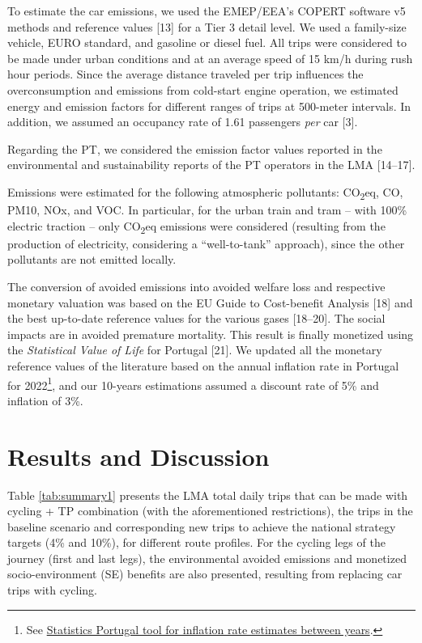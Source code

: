 \documentclass[runningheads]{llncs}
\begin{document}
To estimate the car emissions, we used the EMEP/EEA's COPERT software v5
methods and reference values {[}13{]} for a Tier 3 detail level. We used
a family-size vehicle, EURO standard, and gasoline or diesel fuel. All
trips were considered to be made under urban conditions and at an
average speed of 15 km/h during rush hour periods. Since the average
distance traveled per trip influences the overconsumption and emissions
from cold-start engine operation, we estimated energy and emission
factors for different ranges of trips at 500-meter intervals. In
addition, we assumed an occupancy rate of 1.61 passengers \emph{per} car
{[}3{]}.

Regarding the PT, we considered the emission factor values reported in
the environmental and sustainability reports of the PT operators in the
LMA {[}14--17{]}.

Emissions were estimated for the following atmospheric pollutants:
CO\textsubscript{2}eq, CO, PM10, NOx, and VOC. In particular, for the
urban train and tram -- with 100\% electric traction -- only
CO\textsubscript{2}eq emissions were considered (resulting from the
production of electricity, considering a ``well-to-tank'' approach),
since the other pollutants are not emitted locally.

The conversion of avoided emissions into avoided welfare loss and
respective monetary valuation was based on the EU Guide to Cost-benefit
Analysis {[}18{]} and the best up-to-date reference values for the
various gases {[}18--20{]}. The social impacts are in avoided premature
mortality. This result is finally monetized using the \emph{Statistical
Value of Life} for Portugal {[}21{]}. We updated all the monetary
reference values of the literature based on the annual inflation rate in
Portugal for 2022\footnote{See
  \href{https://www.ine.pt/xportal/xmain?xpid=INE\&xpgid=ipc}{Statistics
  Portugal tool for inflation rate estimates between years}.}, and our
10-years estimations assumed a discount rate of 5\% and inflation of
3\%.

\hypertarget{results-and-discussion}{%
\section{Results and Discussion}\label{results-and-discussion}}

Table \ref{tab:summary1} presents the LMA total daily trips that can be
made with cycling + TP combination (with the aforementioned
restrictions), the trips in the baseline scenario and corresponding new
trips to achieve the national strategy targets (4\% and 10\%), for
different route profiles. For the cycling legs of the journey (first and
last legs), the environmental avoided emissions and monetized
socio-environment (SE) benefits are also presented, resulting from
replacing car trips with cycling.
\end{document}
